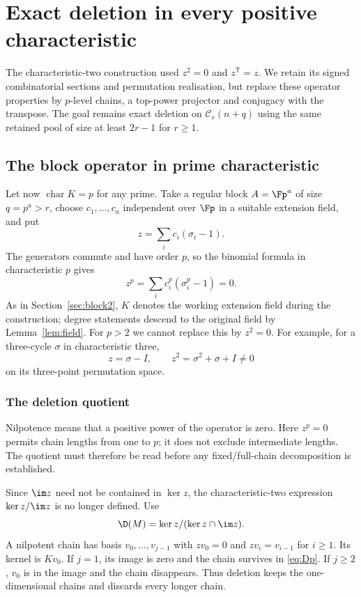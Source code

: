 \section{Exact deletion in every positive characteristic}\label{sec:odd}
The characteristic-two construction used $z^2=0$ and
$z^{\mathsf T}=z$. We retain its signed combinatorial sections and
permutation realisation, but replace these operator properties by
$p$-level chains, a top-power projector and conjugacy with the
transpose. The goal remains exact deletion on $\mathcal C_r(n+q)$
using the same retained pool of size at least $2r-1$ for $r\ge1$.

\subsection{The block operator in prime characteristic}
Let now $\operatorname{char}K=p$ for any prime. Take a regular block $A=\Fp^a$ of size $q=p^a>r$, choose $c_1,\ldots,c_a$ independent over $\Fp$ in a suitable extension field, and put
\[z=\sum_i c_i(\sigma_i-1).
\]
The generators commute and have order $p$, so the binomial formula in characteristic $p$ gives
\[z^p=\sum_i c_i^p(\sigma_i^p-1)=0.
\]
As in Section~\ref{sec:block2}, $K$ denotes the working extension
field during the construction; degree statements descend to the
original field by Lemma~\ref{lem:field}.
For $p>2$ we cannot replace this by $z^2=0$. For example, for a three-cycle $\sigma$ in characteristic three,
\[z=\sigma-I,\qquad z^2=\sigma^2+\sigma+I\ne0
\]
on its three-point permutation space.

\subsubsection{The deletion quotient}
Nilpotence means that a positive power of the operator is zero.
Here $z^p=0$ permits chain lengths from one to $p$; it does not
exclude intermediate lengths. The quotient must therefore be read
before any fixed/full-chain decomposition is established.

Since $\im z$ need not be contained in $\ker z$, the characteristic-two expression $\ker z/\im z$ is no longer defined. Use
\begin{equation}\label{eq:Dp}
\D(M)=\ker z/(\ker z\cap\im z).
\end{equation}
A nilpotent chain has basis $v_0,\ldots,v_{j-1}$ with $zv_0=0$ and $zv_i=v_{i-1}$ for $i\ge1$. Its kernel is $Kv_0$. If $j=1$, its image is zero and the chain survives in \eqref{eq:Dp}. If $j\ge2$, $v_0$ is in the image and the chain disappears. Thus deletion keeps the one-dimensional chains and discards every longer chain.

